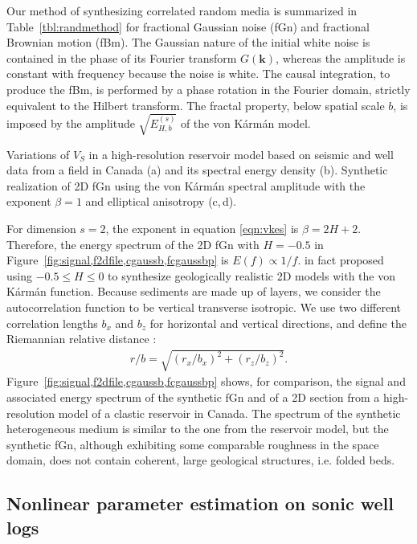 Our method of synthesizing correlated random media is summarized in Table~\ref{tbl:randmethod}
for fractional Gaussian noise (fGn) and fractional Brownian motion (fBm).
The Gaussian nature of the initial white noise is contained in the phase of its Fourier transform $G(\mathbf{k})$, 
whereas the amplitude is constant with frequency  because the noise is white.
The causal integration, to produce the fBm, is performed by a phase rotation in the Fourier domain, strictly equivalent to the Hilbert transform.
The fractal property, below spatial scale $b$, is imposed by the amplitude $\sqrt{E^{(s)}_{H,b}}$ of the von K\'arm\'an model.

{Variations of $V_S$ in a high-resolution reservoir model based 
on seismic and well data from a field in Canada
(a) and its spectral energy density (b).
Synthetic realization of 2D fGn
using the von K\'arm\'an spectral amplitude with the exponent $\beta=1$ 
and elliptical anisotropy (c,\,d).}

For dimension $s=2$, the exponent in equation \ref{eqn:vkes} is $\beta=2H+2$.
Therefore, the energy spectrum of the 2D fGn with $H=-0.5$ in Figure~\ref{fig:signal,f2dfile,cgaussb,fcgaussbp}
is $E(f)\propto 1/f$.
\cite{Klimes_02} in fact proposed using $-0.5\leq H\leq 0$ to synthesize geologically realistic 2D models
with the von K\'arm\'an function.
Because sediments are made up of layers, we consider the autocorrelation function to be vertical transverse isotropic.
We use two different correlation lengths $b_x$ and $b_z$ for horizontal and vertical directions,
and define the Riemannian relative distance \cite[]{Goff_J88}:
\begin{eqnarray}
r/b=\sqrt{(r_x/b_x)^2+(r_z/b_z)^2}.
\end{eqnarray}
Figure~\ref{fig:signal,f2dfile,cgaussb,fcgaussbp}
shows, for comparison, the signal and associated energy spectrum of the synthetic fGn 
and of a 2D section from a high-resolution model of a clastic reservoir in Canada.
The spectrum of the synthetic heterogeneous medium is similar to the one from the reservoir model,
but the synthetic fGn, although exhibiting some comparable roughness in the space domain,
does not contain coherent, large geological structures, i.e. folded beds.


\subsection{Nonlinear parameter estimation on sonic well logs}



